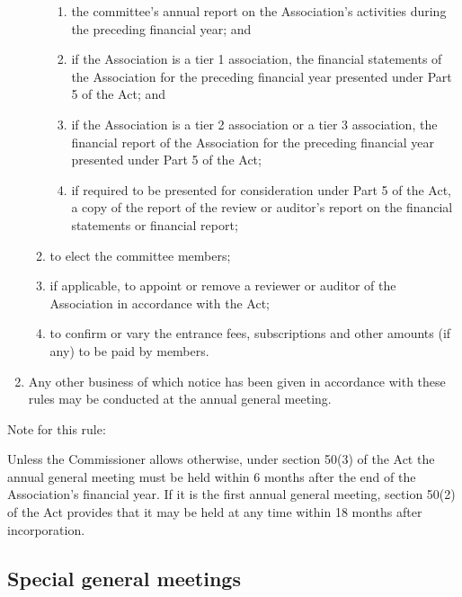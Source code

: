 \documentclass[../constitution.tex]{subfiles}
\begin{document}
\begin{enumerate}
\begin{enumerate}
\begin{enumerate}
    \item the committee's annual report on the Association's activities during the preceding financial year; and
    \item if the Association is a tier 1 association, the financial statements of the Association for the preceding financial year presented under Part 5 of the Act; and \label{consider-financial-statements-for-tier-1}
    \item if the Association is a tier 2 association or a tier 3 association, the financial report of the Association for the preceding financial year presented under Part 5 of the Act; \label{consider-financial-statements-for-tier-2-3}
    \item if required to be presented for consideration under Part 5 of the Act, a copy of the report of the review or auditor's report on the financial statements or financial report; \label{consider-auditors-report-financial-statements}
    \end{enumerate}
  \item to elect the committee members; 
  \item if applicable, to appoint or remove a reviewer or auditor of the Association in accordance with the Act;
  \item to confirm or vary the entrance fees, subscriptions and other amounts (if any) to be paid by members.
  \end{enumerate}
\item Any other business of which notice has been given in accordance with these rules may be conducted at the annual general meeting.
\end{enumerate}


Note for this rule: 

Unless the Commissioner allows otherwise, under section 50(3) of the Act the annual general meeting must be held within 6 months after the end of the Association's financial year.  If it is the first annual general meeting, section 50(2) of the Act provides that it may be held at any time within 18 months after incorporation. 

\hypertarget{special-general-meetings}{%
\subsection{Special general meetings}\label{special-general-meetings}}
\end{document}
